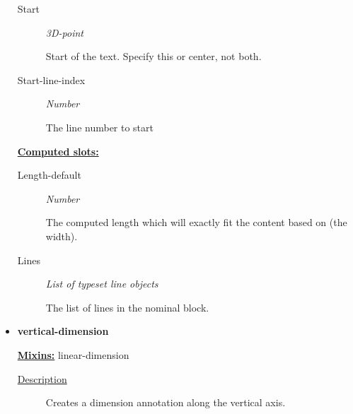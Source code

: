 \documentclass [11pt]{book}
\begin{document}
\begin{itemize}
\begin{description}
\item [Start]
\emph{3D-point}

 Start of the text. Specify this or center, not both.




\item [Start-line-index]
\emph{Number}

 The line number to start




\end{description}






\textbf{
\underline{Computed slots:}}

\begin{description}

\item [Length-default]
\emph{Number}

 The computed length which will exactly fit the content based on (the width).




\item [Lines]
\emph{List of typeset line objects}

 The list of lines in the nominal block.




\end{description}







\item {}
\label{prim:vertical-dimension}
\textbf{vertical-dimension}


\textbf{
\underline{Mixins:}} linear-dimension





\begin{description}

\item [
\underline{Description}]


Creates a dimension annotation along the vertical axis.



\end{description}




\begin{figure}
\begin{lrbox}{\boxedverb}
\begin{minipage}{\linewidth}
{\small

}
\end{minipage}
\end{lrbox}
\end{figure}
\end{itemize}
\end{document}

